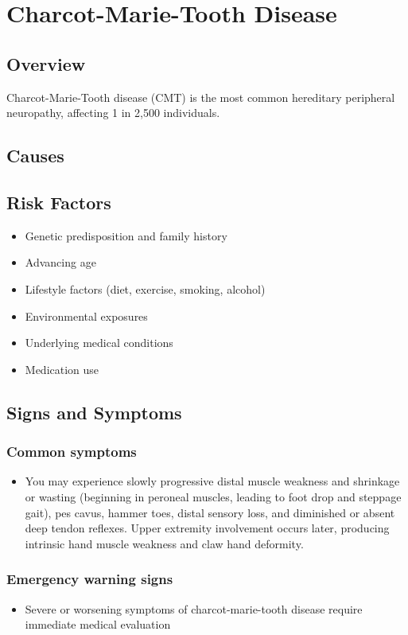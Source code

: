 \chapter{Charcot-Marie-Tooth Disease}
\label{sec:Charcot-Marie-Tooth Disease}

\section{Overview}
Charcot-Marie-Tooth disease (CMT) is the most common hereditary peripheral neuropathy, affecting 1 in 2,500 individuals.
\section{Causes}
\section{Risk Factors}

\begin{itemize}[noitemsep]
  \item Genetic predisposition and family history
  \item Advancing age
  \item Lifestyle factors (diet, exercise, smoking, alcohol)
  \item Environmental exposures
  \item Underlying medical conditions
  \item Medication use
\end{itemize}
\section{Signs and Symptoms}

\subsection{Common symptoms}
\begin{itemize}[noitemsep]
  \item You may experience slowly progressive distal muscle weakness and shrinkage or wasting (beginning in peroneal muscles, leading to foot drop and steppage gait), pes cavus, hammer toes, distal sensory loss, and diminished or absent deep tendon reflexes. Upper extremity involvement occurs later, producing intrinsic hand muscle weakness and claw hand deformity. 
  \end{itemize}

\subsection{Emergency warning signs}
\begin{itemize}[noitemsep]
  \item Severe or worsening symptoms of charcot-marie-tooth disease require immediate medical evaluation
\end{itemize}
